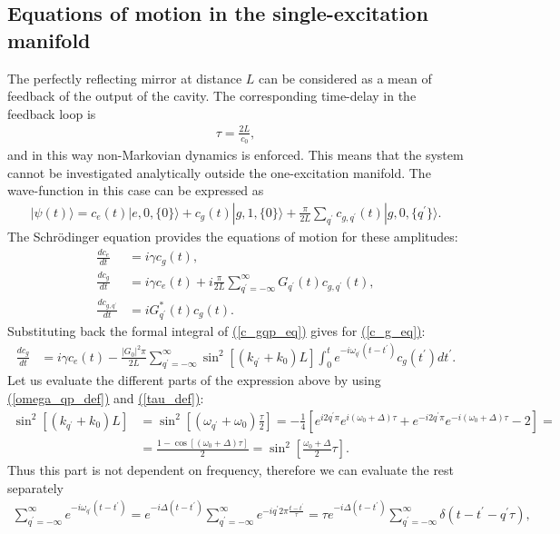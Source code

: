 \documentclass[11pt, a4paper]{article}
\def\ket#1{|#1\rangle}
\def\qp{{q^\prime}}
\def\tp{{t^\prime}}
\def\nn{\nonumber}
\newcommand{\lsz}{\left[}
\newcommand{\rsz}{\right]}
\newcommand{\lk}{\left(}
\newcommand{\rk}{\right)}
\def\refeq#1{{\hyperref[#1]{(\ref*{#1})}}}
\begin{document}
\subsection{Equations of motion in the single-excitation manifold}
The perfectly reflecting mirror at distance $L$ can be considered as a mean of feedback of the output of the cavity. The corresponding time-delay in the feedback loop is
\begin{align}
\label{tau_def}
\tau = \frac{2L}{c_0},
\end{align}
and in this way non-Markovian dynamics is enforced. This means that the system cannot be investigated analytically outside the one-excitation manifold. The wave-function in this case can be expressed as
\begin{align}
\ket{\psi(t)} = c_e(t)\ket{e,0,\{0\}} + c_g(t)\ket{g,1,\{0\}} + \frac{\pi}{2L}\sum_\qp c_{g,\qp}(t)\ket{g,0,\{\qp\}}.
\end{align}
The Schr\"odinger equation provides the equations of motion for these amplitudes:
\begin{align}
\label{c_e_eq}
\frac{dc_e}{dt} &= i\gamma c_g(t),\\
\label{c_g_eq}
\frac{dc_g}{dt} &= i\gamma c_e(t) + i\frac{\pi}{2L}\sum_{\qp=-\infty}^{\infty}G_\qp(t)c_{g,\qp}(t),\\
\label{c_gqp_eq}
\frac{dc_{g,\qp}}{dt} &= iG^*_\qp(t)c_g(t).
\end{align}
Substituting back the formal integral of \refeq{c_gqp_eq} gives for \refeq{c_g_eq}:
\begin{align}
\frac{dc_g}{dt} &= i\gamma c_e(t) - \frac{|G_0|^2\pi}{2L}\sum_{\qp=-\infty}^{\infty}\sin^2{\lsz(k_\qp+k_0)L\rsz}\int_0^te^{-i\omega_\qp (t-\tp)} c_{g}(\tp)d\tp\nn.
\end{align}
Let us evaluate the different parts of the expression above by using \refeq{omega_qp_def} and \refeq{tau_def}:
\begin{align}
\sin^2{\lsz(k_\qp+k_0)L\rsz} &= \sin^2{\lsz\lk\omega_\qp+\omega_0\rk\frac{\tau}{2}\rsz} =
 -\frac{1}{4}\lsz e^{i2\qp\pi}e^{i\lk\omega_0+\Delta\rk\tau}+e^{-i2\qp\pi}e^{-i\lk\omega_0+\Delta\rk\tau}-2 \rsz=\nn\\
&=\frac{1-\cos{\lsz\lk\omega_0+\Delta\rk\tau\rsz}}{2} = \sin^2{\lsz\frac{\omega_0+\Delta}{2}\tau\rsz}.
\end{align}
Thus this part is not dependent on frequency, therefore we can evaluate the rest separately
\begin{align}
\sum_{\qp=-\infty}^{\infty}e^{-i\omega_\qp (t-\tp)} = e^{-i\Delta (t-\tp)}\sum_{\qp=-\infty}^{\infty}e^{-i\qp 2\pi \frac{t-\tp}{\tau}} = 
\tau e^{-i\Delta (t-\tp)}\sum_{\qp = -\infty}^\infty\delta\lk t-\tp-\qp\tau\rk,
\end{align}
\end{document}
